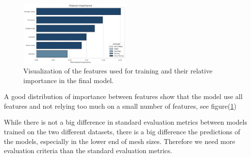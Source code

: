 \begin{figure}[htbp]
\centering
\includegraphics[width=0.5\textwidth]{figures/feature_importance_lowQ.png}
\caption{Visualization of the features used for training and their relative importance in the final model.}
\label{fig:feature_importance}
\end{figure}

A good distribution of importance between features show that the model use all features and not relying too much on a small number of features, see figure(\ref{fig:feature_importance})

While there is not a big difference in standard evaluation metrics between models trained on the two different datasets, there is a big difference the predictions of the models, especially in the lower end of mesh sizes. Therefore we need more evaluation criteria than the standard evaluation metrics.

